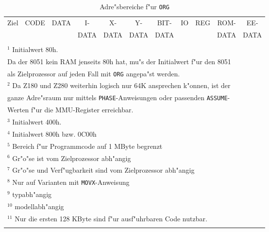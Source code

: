 \documentclass[12pt,a4paper,twoside]{report}
\newcommand{\tty}[1]{{\tt #1}}
\newcommand{\tin}[1]{{\scriptsize #1}}
\begin{document}
\hfuzz=60pt
\begin{longtable}{|l|c|c|c|c|c|c|c|c|c|c|}
\hline
\tin{Ziel} & \tin{CODE} & \tin{DATA} & \tin{I-}   & \tin{X-}   & \tin{Y-}   & \tin{BIT-} & \tin{IO} & \tin{REG} & \tin{ROM-} & \tin{EE-} \\
           &            &            & \tin{DATA} & \tin{DATA} & \tin{DATA} & \tin{DATA} &          &           & \tin{DATA} & \tin{DATA} \\
\hline
\hline
\endhead

\\ \hline
\multicolumn{11}{|l|}{$^{1}$ Initialwert 80h. } \\
\multicolumn{11}{|l|}{  Da der 8051 kein RAM jenseits 80h hat, mu"s der Initialwert f"ur den 8051} \\
\multicolumn{11}{|l|}{  als Zielprozessor auf jeden Fall mit \tty{ORG} angepa"st werden.} \\
\hline
\multicolumn{11}{|l|}{$^{2}$ Da Z180 und Z280 weiterhin logisch nur 64K ansprechen k"onnen, ist der} \\
\multicolumn{11}{|l|}{ganze Adre"sraum nur mittels \tty{PHASE}-Anweisungen oder passenden \tty{ASSUME}-} \\
\multicolumn{11}{|l|}{Werten f"ur die MMU-Register erreichbar.} \\
\hline
\multicolumn{11}{|l|}{$^{3}$ Initialwert 400h.} \\
\hline
\multicolumn{11}{|l|}{$^{4}$ Initialwert 800h bzw. 0C00h} \\
\hline
\multicolumn{11}{|l|}{$^{5}$ Bereich f"ur Programmcode auf 1 MByte begrenzt} \\
\hline
\multicolumn{11}{|l|}{$^{6}$ Gr"o"se ist vom Zielprozessor abh"angig} \\
\hline
\multicolumn{11}{|l|}{$^{7}$ Gr"o"se und Verf"ugbarkeit sind vom Zielprozessor abh"angig} \\
\hline
\multicolumn{11}{|l|}{$^{8}$ Nur auf Varianten mit \tty{MOVX}-Anweisung} \\
\hline
\multicolumn{11}{|l|}{$^{9}$ typabh"angig} \\
\hline
\multicolumn{11}{|l|}{$^{10}$ modellabh"angig} \\
\hline
\multicolumn{11}{|l|}{$^{11}$ Nur die ersten 128 KByte sind f"ur ausf"uhrbaren Code nutzbar.} \\
\hline
\caption{Adre"sbereiche f"ur \tty{ORG}}
\label{TabORG}
\end{longtable}
\hfuzz=0pt

\end{document}
